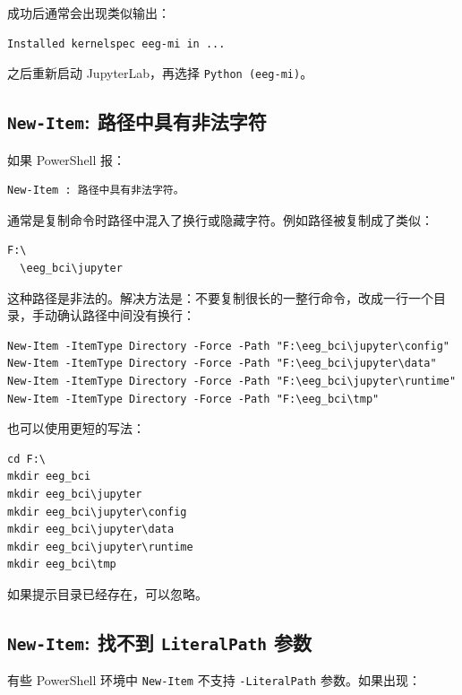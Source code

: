 \documentclass[UTF8,a4paper,12pt]{ctexart}
\begin{document}
成功后通常会出现类似输出：

\begin{lstlisting}[language={}]
Installed kernelspec eeg-mi in ...
\end{lstlisting}

之后重新启动 JupyterLab，再选择 \texttt{Python (eeg-mi)}。

\subsection{\texttt{New-Item}: 路径中具有非法字符}

如果 PowerShell 报：

\begin{lstlisting}[language={}]
New-Item : 路径中具有非法字符。
\end{lstlisting}

通常是复制命令时路径中混入了换行或隐藏字符。例如路径被复制成了类似：

\begin{lstlisting}[language={}]
F:\
  \eeg_bci\jupyter
\end{lstlisting}

这种路径是非法的。解决方法是：不要复制很长的一整行命令，改成一行一个目录，手动确认路径中间没有换行：

\begin{lstlisting}[language={},caption={逐行创建目录}]
New-Item -ItemType Directory -Force -Path "F:\eeg_bci\jupyter\config"
New-Item -ItemType Directory -Force -Path "F:\eeg_bci\jupyter\data"
New-Item -ItemType Directory -Force -Path "F:\eeg_bci\jupyter\runtime"
New-Item -ItemType Directory -Force -Path "F:\eeg_bci\tmp"
\end{lstlisting}

也可以使用更短的写法：

\begin{lstlisting}[language={},caption={使用 mkdir 创建目录}]
cd F:\
mkdir eeg_bci
mkdir eeg_bci\jupyter
mkdir eeg_bci\jupyter\config
mkdir eeg_bci\jupyter\data
mkdir eeg_bci\jupyter\runtime
mkdir eeg_bci\tmp
\end{lstlisting}

如果提示目录已经存在，可以忽略。

\subsection{\texttt{New-Item}: 找不到 \texttt{LiteralPath} 参数}

有些 PowerShell 环境中 \texttt{New-Item} 不支持 \texttt{-LiteralPath} 参数。如果出现：
\end{document}

